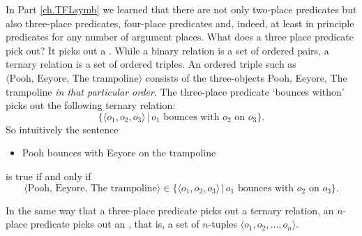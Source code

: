 In Part \ref{ch.TFLsymb} we learned that there are not only two-place predicates but also three-place predicates, four-place predicates and, indeed, at least in principle predicates for any number of argument places. What does a three place predicate pick out? It picks out a . While a binary relation is a set of ordered pairs, a ternary relation is a set of ordered triples. An ordered triple such as $\langle\text{Pooh, Eeyore, The trampoline}\rangle$ consists of the three-objects Pooh, Eeyore, The trampoline \emph{in that particular order}. The three-place predicate `bounces withon' picks out the following ternary relation:
$$\{\langle o_1,o_2,o_3\rangle\,|\,o_1\text{ bounces with }o_2\text{ on }o_3\}.$$
So intuitively the sentence 
\begin{itemize}
\item Pooh bounces with Eeyore on the trampoline
\end{itemize}
is true if and only if
$$\langle\text{Pooh, Eeyore, The trampoline}\rangle\in\{\langle o_1,o_2,o_3\rangle\,|\,o_1\text{ bounces with }o_2\text{ on }o_3\}.$$

In the same way that a three-place predicate picks out a ternary relation, an $n$-place predicate picks out an , that is, a set of $n$-tuples $\langle o_1,o_2,\ldots,o_n\rangle$.


